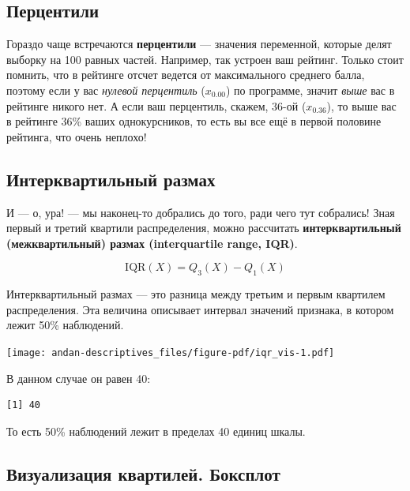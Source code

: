 \documentclass[
  letterpaper,
]{scrbook}
\newenvironment{Shaded}{}{}
\newcommand{\FunctionTok}[1]{\textcolor[rgb]{0.44,0.26,0.76}{#1}}
\newcommand{\NormalTok}[1]{\textcolor[rgb]{0.14,0.16,0.18}{#1}}
\newcommand{\SpecialCharTok}[1]{\textcolor[rgb]{0.00,0.36,0.77}{#1}}
\theoremstyle{definition}
\theoremstyle{remark}
\begin{document}
\subsection{Перцентили}\label{percentiles}

Гораздо чаще встречаются \textbf{перцентили} --- значения переменной,
которые делят выборку на 100 равных частей. Например, так устроен ваш
рейтинг. Только стоит помнить, что в рейтинге отсчет ведется от
максимального среднего балла, поэтому если у вас \emph{нулевой
перцентиль} (\(x_{0.00}\)) по программе, значит \emph{выше} вас в
рейтинге никого нет. А если ваш перцентиль, скажем, 36-ой
(\(x_{0.36}\)), то выше вас в рейтинге 36\% ваших однокурсников, то есть
вы все ещё в первой половине рейтинга, что очень неплохо!

\subsection{Интерквартильный размах}\label{iqr}

И --- о, ура! --- мы наконец-то добрались до того, ради чего тут
собрались! Зная первый и третий квартили распределения, можно рассчитать
\textbf{интерквартильный (межквартильный) размах (interquartile range,
IQR)}.

\[
\mathrm{IQR}(X) = Q_3(X) - Q_1(X)
\]

Интерквартильный размах --- это разница между третьим и первым квартилем
распределения. Эта величина описывает интервал значений признака, в
котором лежит 50\% наблюдений.

\texttt{[image: andan-descriptives\_files/figure-pdf/iqr\_vis-1.pdf]}

В данном случае он равен 40:

\begin{Shaded}
\end{Shaded}

\begin{verbatim}
[1] 40
\end{verbatim}

То есть 50\% наблюдений лежит в пределах 40 единиц шкалы.

\subsection{Визуализация квартилей. Боксплот}\label{boxplot}
\end{document}
